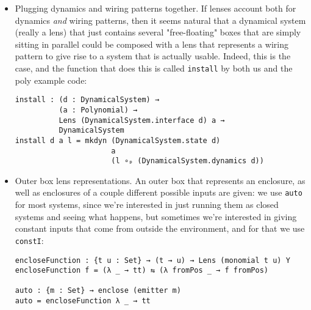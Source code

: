 \begin{itemize}
    \item Plugging dynamics and wiring patterns together. If lenses account both for dynamics \textit{and} wiring patterns, then it seems natural that a dynamical system (really a lens) that just contains several "free-floating" boxes that are simply sitting in parallel could be composed with a lens that represents a wiring pattern to give rise to a system that is actually usable. Indeed, this is the case, and the function that does this is called \texttt{install} by both us and the poly example code:
    \begin{verbatim}
install : (d : DynamicalSystem) → 
          (a : Polynomial) → 
          Lens (DynamicalSystem.interface d) a → 
          DynamicalSystem
install d a l = mkdyn (DynamicalSystem.state d)
                      a 
                      (l ∘ₚ (DynamicalSystem.dynamics d))
\end{verbatim}
    \item Outer box lens representations. An outer box that represents an enclosure, as well as enclosures of a couple different possible inputs are given: we use \texttt{auto} for most systems, since we're interested in just running them as closed systems and seeing what happens, but sometimes we're interested in giving constant inputs that come from outside the environment, and for that we use \texttt{constI}:
\begin{verbatim}
encloseFunction : {t u : Set} → (t → u) → Lens (monomial t u) Y
encloseFunction f = (λ _ → tt) ⇆ (λ fromPos _ → f fromPos)

auto : {m : Set} → enclose (emitter m)
auto = encloseFunction λ _ → tt


\end{verbatim}
\end{itemize}
